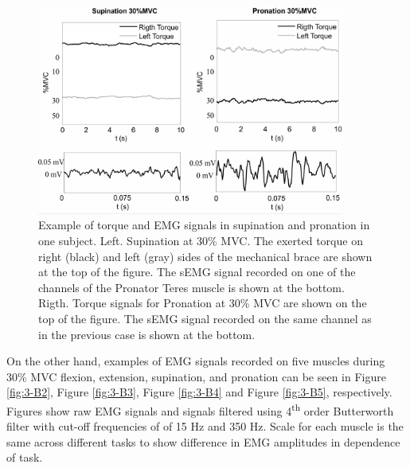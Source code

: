 \begin{figure}[ht]
\centering
\includegraphics[width=0.9\textwidth]{Images/figure3_B1.png}
\caption{Example of torque and EMG signals in supination and pronation in one subject. Left. Supination at 30\% MVC. The exerted torque on right (black) and left (gray) sides of the mechanical brace are shown at the top of the figure. The sEMG signal recorded on one of the channels of the Pronator Teres muscle is shown at the bottom. Rigth. Torque signals for Pronation at 30\% MVC are shown on the top of the figure. The sEMG signal recorded on the same channel as in the previous case is shown at the bottom.}
\label{fig:3-B1}
\end{figure}   


On the other hand, examples of EMG signals recorded on five muscles during 30\% MVC flexion, extension, supination, and pronation can be seen in Figure \ref{fig:3-B2}, Figure \ref{fig:3-B3}, Figure \ref{fig:3-B4} and Figure \ref{fig:3-B5}, respectively. Figures show raw EMG signals and signals filtered using 4\textsuperscript{th} order Butterworth filter with cut-off frequencies of of 15 Hz and 350 Hz. Scale for each muscle is the same across different tasks to show difference in EMG amplitudes in dependence of task.

